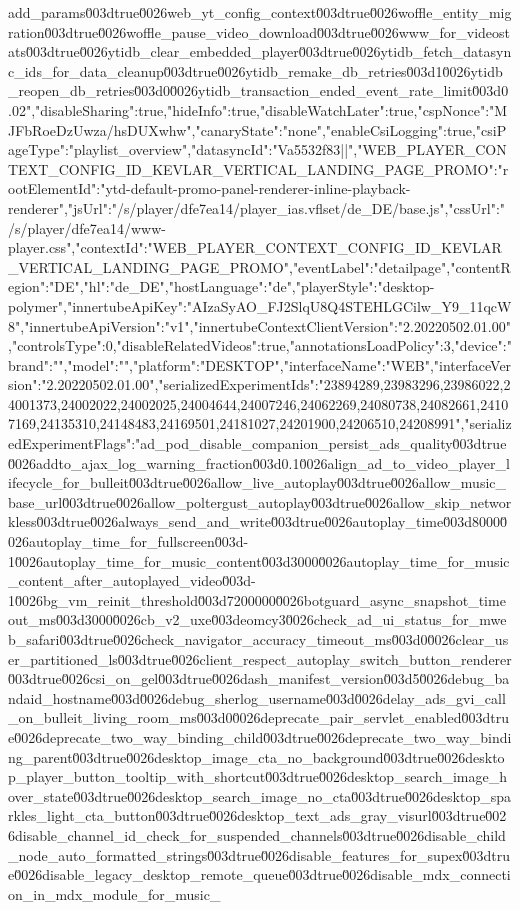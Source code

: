 {add_params\u003dtrue\u0026web_yt_config_context\u003dtrue\u0026woffle_entity_migration\u003dtrue\u0026woffle_pause_video_download\u003dtrue\u0026www_for_videostats\u003dtrue\u0026ytidb_clear_embedded_player\u003dtrue\u0026ytidb_fetch_datasync_ids_for_data_cleanup\u003dtrue\u0026ytidb_remake_db_retries\u003d1\u0026ytidb_reopen_db_retries\u003d0\u0026ytidb_transaction_ended_event_rate_limit\u003d0.02","disableSharing":true,"hideInfo":true,"disableWatchLater":true,"cspNonce":"MJFbRoeDzUwza/hsDUXwhw","canaryState":"none","enableCsiLogging":true,"csiPageType":"playlist_overview","datasyncId":"Va5532f83||"},"WEB_PLAYER_CONTEXT_CONFIG_ID_KEVLAR_VERTICAL_LANDING_PAGE_PROMO":{"rootElementId":"ytd-default-promo-panel-renderer-inline-playback-renderer","jsUrl":"/s/player/dfe7ea14/player_ias.vflset/de_DE/base.js","cssUrl":"/s/player/dfe7ea14/www-player.css","contextId":"WEB_PLAYER_CONTEXT_CONFIG_ID_KEVLAR_VERTICAL_LANDING_PAGE_PROMO","eventLabel":"detailpage","contentRegion":"DE","hl":"de_DE","hostLanguage":"de","playerStyle":"desktop-polymer","innertubeApiKey":"AIzaSyAO_FJ2SlqU8Q4STEHLGCilw_Y9_11qcW8","innertubeApiVersion":"v1","innertubeContextClientVersion":"2.20220502.01.00","controlsType":0,"disableRelatedVideos":true,"annotationsLoadPolicy":3,"device":{"brand":"","model":"","platform":"DESKTOP","interfaceName":"WEB","interfaceVersion":"2.20220502.01.00"},"serializedExperimentIds":"23894289,23983296,23986022,24001373,24002022,24002025,24004644,24007246,24062269,24080738,24082661,24107169,24135310,24148483,24169501,24181027,24201900,24206510,24208991","serializedExperimentFlags":"ad_pod_disable_companion_persist_ads_quality\u003dtrue\u0026addto_ajax_log_warning_fraction\u003d0.1\u0026align_ad_to_video_player_lifecycle_for_bulleit\u003dtrue\u0026allow_live_autoplay\u003dtrue\u0026allow_music_base_url\u003dtrue\u0026allow_poltergust_autoplay\u003dtrue\u0026allow_skip_networkless\u003dtrue\u0026always_send_and_write\u003dtrue\u0026autoplay_time\u003d8000\u0026autoplay_time_for_fullscreen\u003d-1\u0026autoplay_time_for_music_content\u003d3000\u0026autoplay_time_for_music_content_after_autoplayed_video\u003d-1\u0026bg_vm_reinit_threshold\u003d7200000\u0026botguard_async_snapshot_timeout_ms\u003d3000\u0026cb_v2_uxe\u003deomcy3\u0026check_ad_ui_status_for_mweb_safari\u003dtrue\u0026check_navigator_accuracy_timeout_ms\u003d0\u0026clear_user_partitioned_ls\u003dtrue\u0026client_respect_autoplay_switch_button_renderer\u003dtrue\u0026csi_on_gel\u003dtrue\u0026dash_manifest_version\u003d5\u0026debug_bandaid_hostname\u003d\u0026debug_sherlog_username\u003d\u0026delay_ads_gvi_call_on_bulleit_living_room_ms\u003d0\u0026deprecate_pair_servlet_enabled\u003dtrue\u0026deprecate_two_way_binding_child\u003dtrue\u0026deprecate_two_way_binding_parent\u003dtrue\u0026desktop_image_cta_no_background\u003dtrue\u0026desktop_player_button_tooltip_with_shortcut\u003dtrue\u0026desktop_search_image_hover_state\u003dtrue\u0026desktop_search_image_no_cta\u003dtrue\u0026desktop_sparkles_light_cta_button\u003dtrue\u0026desktop_text_ads_gray_visurl\u003dtrue\u0026disable_channel_id_check_for_suspended_channels\u003dtrue\u0026disable_child_node_auto_formatted_strings\u003dtrue\u0026disable_features_for_supex\u003dtrue\u0026disable_legacy_desktop_remote_queue\u003dtrue\u0026disable_mdx_connection_in_mdx_module_for_music_}
